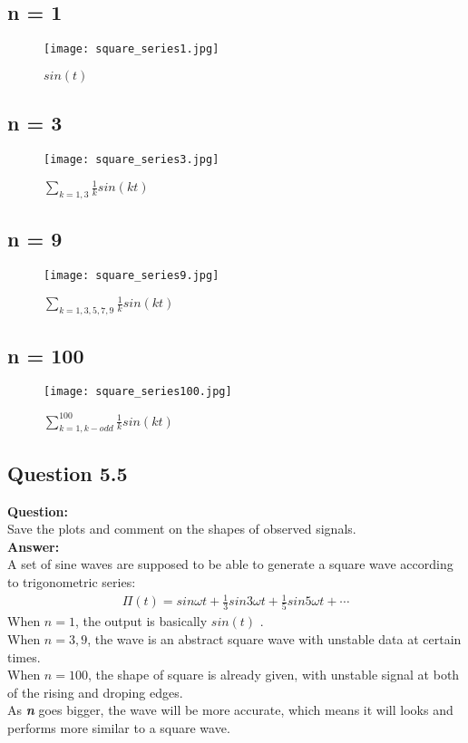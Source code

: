 \documentclass[12pt,fleqn]{article}
\begin{document}
\subsection{n = 1}
\begin{figure}[H]
\centering
\texttt{[image: square\_series1.jpg]}
\caption{$sin(t)$}
\end{figure}

\subsection{n = 3}
\begin{figure}[H]
\centering
\texttt{[image: square\_series3.jpg]}
\caption{$\sum_{k=1,3}\frac{1}{k}sin(kt)$}
\end{figure}

\subsection{n = 9}
\begin{figure}[H]
\centering
\texttt{[image: square\_series9.jpg]}
\caption{$\sum_{k=1,3,5,7,9}\frac{1}{k}sin(kt)$}
\end{figure}

\subsection{n = 100}
\begin{figure}[H]
\centering
\texttt{[image: square\_series100.jpg]}
\caption{$\sum_{k=1,k-odd}^{100}\frac{1}{k}sin(kt)$}
\end{figure}
\subsection{Question 5.5}
\textbf{Question:}\\
Save the plots and comment on the shapes of observed signals.\\
\textbf{Answer:}\\
A set of sine waves are supposed to be able to generate a square wave according to trigonometric series:
\begin{gather}
\Pi(t) = sin\omega{}t+\frac{1}{3}sin3\omega{}t+\frac{1}{5}sin5\omega{}t+\cdots
\end{gather}
When $n = 1$, the output is basically $sin(t)$ .\\
When $n = 3, 9$, the wave is an abstract square wave with unstable data at certain times.\\
When $n = 100$, the shape of square is already given, with unstable signal at both of the rising and droping edges.\\
As \emph{\textbf{n}} goes bigger, the wave will be more accurate, which means it will looks and performs more similar to a square wave.
\end{document}
